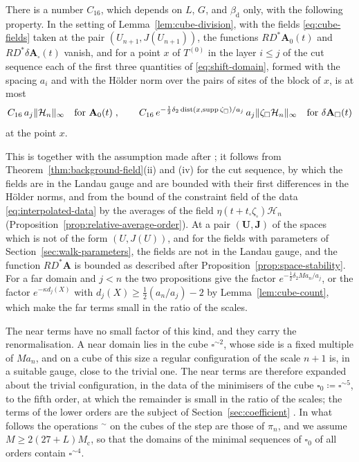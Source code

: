 \documentclass[11pt]{preprint}
\newcommand{\dist}{\operatorname{dist}}
\DeclarePairedDelimiter{\norm}{\lVert}{\rVert}
\numberwithin{equation}{section}
\begin{document}
\begin{proposition}\label{prop:far-fields}
There is a number $C_{16}$, which depends on $L$, $G$, and $\beta_{\mathrm d}$ only, with the following property. In the setting of Lemma~\ref{lem:cube-division}, with the fields \eqref{eq:cube-fields} taken at the pair $(U_{n+1}, J(U_{n+1}))$, the functions $RD^*\mathbf A_0(t)$ and $RD^*\delta\mathbf A_\square(t)$ vanish, and for a point $x$ of $T^{(0)}$ in the layer $i \leqslant j$ of the cut sequence each of the first three quantities of \eqref{eq:shift-domain}, formed with the spacing $a_i$ and with the H\"older norm over the pairs of sites of the block of $x$, is at most
\begin{equation}\label{eq:far-fields}
    C_{16}\,a_j\norm{\mathcal H_n}_\infty
    \quad\text{for } \mathbf A_0(t)\;,
    \qquad
    C_{16}\,e^{-\frac{1}{2}\delta_2\dist(x, \operatorname{supp}\zeta_\square)/a_j}\,a_j\norm{\zeta_\square\mathcal H_n}_\infty
    \quad\text{for } \delta\mathbf A_\square(t)
\end{equation}
at the point $x$.
\end{proposition}

This is \cite[(3.9)]{BalabanRG1} together with the assumption made after \cite[(3.15)]{BalabanRG1}; it follows from Theorem~\ref{thm:background-field}(ii) and (iv) for the cut sequence, by which the fields are in the Landau gauge and are bounded with their first differences in the H\"older norms, and from the bound of the constraint field of the data \eqref{eq:interpolated-data} by the averages of the field $\eta(t + t_\square\zeta_\square)\mathcal H_n$ (Proposition~\ref{prop:relative-average-order}). At a pair $(\mathbf U, \mathbf J)$ of the spaces which is not of the form $(U, J(U))$, and for the fields with parameters of Section~\ref{sec:walk-parameters}, the fields are not in the Landau gauge, and the function $RD^*\mathbf A$ is bounded as described after Proposition~\ref{prop:space-stability}. For a far domain and $j < n$ the two propositions give the factor $e^{-\frac{1}{2}\delta_2Ma_n/a_j}$, or the factor $e^{-\kappa d_j(X)}$ with $d_j(X) \geqslant \frac{1}{2}(a_n/a_j) - 2$ by Lemma~\ref{lem:cube-count}, which make the far terms small in the ratio of the scales.

The near terms have no small factor of this kind, and they carry the renormalisation. A near domain lies in the cube $\square^{\sim2}$, whose side is a fixed multiple of $Ma_n$, and on a cube of this size a regular configuration of the scale $n + 1$ is, in a suitable gauge, close to the trivial one. The near terms are therefore expanded about the trivial configuration, in the data of the minimisers of the cube $\square_0 \coloneqq \square^{\sim5}$, to the fifth order, at which the remainder is small in the ratio of the scales; the terms of the lower orders are the subject of Section~\ref{sec:coefficient} \cite[(3.18)--(3.54), pp.~273--280]{BalabanRG1}. In what follows the operations ${}^\sim$ on the cubes of the step are those of $\pi_n$, and we assume $M \geqslant 2(27 + L)M_{\mathrm c}$, so that the domains of the minimal sequences of $\square_0$ of all orders contain $\square^{\sim4}$.
\end{document}
